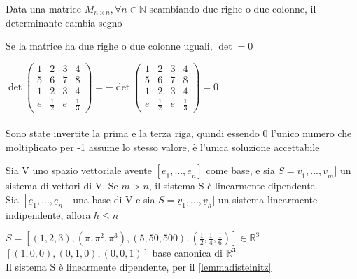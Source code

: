 \begin{proposizione}
	Data una matrice $M_{n\times n}, \forall n\in\mathbb{N}$ scambiando due righe o due colonne, il determinante cambia segno\\
	\begin{corollario}
		Se la matrice ha due righe o due colonne uguali, $\det=0$
		\begin{dimostrazione}
			$\det\begin{pmatrix}
				1 & 2 & 3 & 4\\
				5 & 6 & 7 & 8\\
				1 & 2 & 3 & 4\\
				e & \frac{1}{2} & e & \frac{1}{3}
			\end{pmatrix}=-\det\begin{pmatrix}
				1 & 2 & 3 & 4\\
				5 & 6 & 7 & 8\\
				1 & 2 & 3 & 4\\
				e & \frac{1}{2} & e & \frac{1}{3}
			\end{pmatrix}=0$\\\\
			Sono state invertite la prima e la terza riga, quindi essendo 0 l'unico numero che moltiplicato per -1 assume lo stesso valore, è l'unica soluzione accettabile
		\end{dimostrazione}
	\end{corollario} 
\end{proposizione}

\begin{lemma}[Steinitz]\label{lemmadisteinitz}
	Sia V uno spazio vettoriale avente $[\underline{e}_1,...,\underline{e}_n]$ come base, e sia $S=\underline{v}_1,...,\underline{v}_m]$ un sistema di vettori di V. Se $m>n$, il sistema S è linearmente dipendente.\\
	Sia $[\underline{e}_1,...,\underline{e}_n]$ una base di V e sia $S=\underline{v}_1,...,\underline{v}_h]$ un sistema linearmente indipendente, allora $h\leq n$
	\begin{es}
		$S=[(1,2,3),(\pi,\pi^2,\pi^3),(5,50,500),(\frac{1}{2},\frac{1}{4},\frac{1}{6})]\in\mathbb{R}^3$\\
		$[(1,0,0),(0,1,0),(0,0,1)]$ base canonica di $\mathbb{R}^3$\\
		Il sistema S è linearmente dipendente, per il \ref{lemmadisteinitz}
	\end{es}
\end{lemma}

